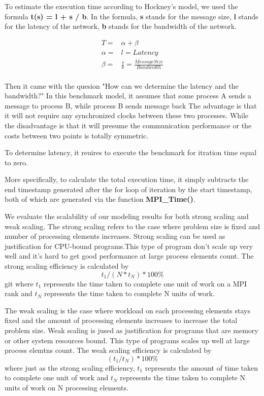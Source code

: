 
To estimate the execution time according to Hockney's model,
we used the formula \textbf{t(s) = l + s / b}. In the formula,
\textbf{s} stands for the message size,
\textbf{l} stands for the latency of the network,
\textbf{b} stands for the bandwidth of the network.

\begin{equation*}
    \begin{aligned}
    T = & \alpha + \beta \\
    \alpha = & l = Latency \\
    \beta = & \frac{s} {b} = \frac{Message Size} {Bandwidth}\\
    \end{aligned}
\end{equation*}

Then it came with the quesion "How can we determine the latency and the bandwidth?"
In this benchmark model, it assumes that some process A sends a message to process B, while process B sends message back
The advantage is that it will not require any synchronized clocks between these two processes.
While the disadvantage is that it will presume the communication performance or the costs between two points is totally symmetric.

To determine latency, it reuires to execute the benchmark for itration time equal to zero.

More specifically, to calculate the total execution time,
it simply subtracts the end timestamp generated after the for loop of iteration
by the start timestamp, both of which are generated via the function \textbf{MPI\_Time()}.

We evaluate the scalability of our modeling results for both strong scaling and weak scaling. The strong scaling refers to the case where problem size is fixed and number of processing elements increases. Strong scaling can be used as justification for CPU-bound programs.This type of program don't scale up very well and it's hard to get good performance at large process elements count. The strong scaling efficiency is calculated by
\begin{equation*}
t_1 / ( N * t_N ) * 100\% 
\end{equation*}git 
where $t_1$ represents the time taken to complete one unit of work on a MPI rank and $t_N$ represents the time taken to complete N units of work. 

The weak scaling is the case where workload on each processing elements stays fixed and the amount of processing elements increases to increase the total problem size. Weak scaling is jused as justification for programs that are memory or other system resources bound. This type of programs scales up well at large process elemtns count. The weak scaling efficiency is calculated by
\begin{equation*}
( t_1 / t_N ) * 100\% 
\end{equation*}
where just as the strong scaling efficiency, $t_1$ represents the amount of time taken to complete one unit of work and $t_N$ represents the time taken to complete N units of work on N processing elements.